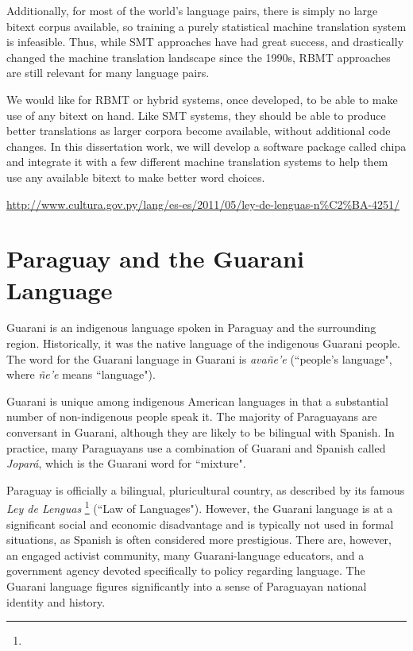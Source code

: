 Additionally, for most of the world's language pairs, there is simply no large
bitext corpus available, so training a purely statistical machine translation
system is infeasible.
Thus, while SMT approaches have had great success, and drastically changed the
machine translation landscape since the 1990s, RBMT approaches are still
relevant for many language pairs.

We would like for RBMT or hybrid systems, once developed, to be able to make
use of any bitext on hand.  Like SMT systems, they should be able to produce
better translations as larger corpora become available, without additional code
changes.
In this dissertation work, we will develop a software package called
chipa and integrate it with a few  different machine translation systems to
help them use any available bitext to make better word choices.


\urldef{\leydelenguas}\url{http://www.cultura.gov.py/lang/es-es/2011/05/ley-de-lenguas-n%C2%BA-4251/}

\section{Paraguay and the Guarani Language}
Guarani is an indigenous language spoken in Paraguay and the surrounding
region.
Historically, it was the native language of the indigenous Guarani people. The
word for the Guarani language in Guarani is \emph{avañe'e} (``people's
language", where \emph{ñe'e} means ``language").

Guarani is unique among indigenous American languages in that a substantial
number of non-indigenous people speak it.  The majority of Paraguayans are
conversant in Guarani, although they are likely to be bilingual with Spanish.
In practice, many Paraguayans use a combination of Guarani and Spanish called
\emph{Jopar{\'a}}, which is the Guarani word for ``mixture".

Paraguay is officially a bilingual, pluricultural country, as described by its
famous \emph{Ley de Lenguas} \footnote{\leydelenguas} (``Law of Languages").
However, the Guarani language is at a significant social and economic
disadvantage and is typically not used in formal situations, as Spanish is
often considered more prestigious. There are, however, an engaged activist
community, many Guarani-language educators, and a government agency devoted
specifically to policy regarding language.
The Guarani language figures significantly into a sense of Paraguayan national
identity and history.

